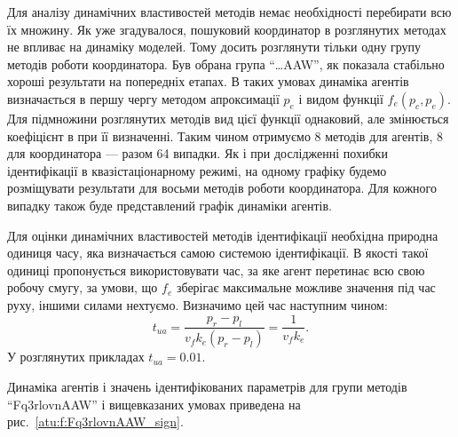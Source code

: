 Для аналізу динамічних властивостей методів немає необхідності
перебирати всю їх множину. Як уже згадувалося, пошуковий
координатор в розглянутих методах не впливає на динаміку
моделей. Тому досить розглянути тільки одну групу методів роботи
координатора. Був обрана група ``\ldots{}AAW'', як показала стабільно
хороші результати на попередніх етапах. В таких умовах динаміка
агентів визначається в першу чергу методом апроксимації
$ p_e $ і видом функції
$ f_e (p_c, p_e) $. Для підмножини розглянутих методів вид цієї функції
однаковий, але змінюється коефіцієнт в при її визначенні. Таким
чином отримуємо 8 методів для агентів, 8 для координатора ---
разом 64 випадки. Як і при дослідженні похибки ідентифікації в
квазістаціонарному режимі, на одному графіку будемо розміщувати
результати для восьми методів роботи координатора. Для кожного
випадку також буде представлений графік динаміки агентів.

Для оцінки динамічних властивостей методів ідентифікації необхідна природна
одиниця часу, яка визначається самою системою ідентифікації.
В якості такої
одиниці пропонується використовувати час, за яке агент перетинає всю свою
робочу смугу, за умови, що $f_e$ зберігає максимальне можливе значення під
час руху, іншими силами нехтуємо.
Визначимо цей час  наступним чином:
%
\begin{equation}
  t_{ua} = \frac{p_r - p_l}{ v_f k_e (p_r - p_l)} = \frac{1}{v_f k_e}.
  \label{atu:eq:t_ua}
\end{equation}
%
У розглянутих прикладах $t_{ua} = 0.01$.

Динаміка агентів і значень ідентифікованих параметрів для групи методів
``Fq3rlovnAAW'' і вищевказаних умовах приведена на рис.~\ref{atu:f:Fq3rlovnAAW_sign}.


